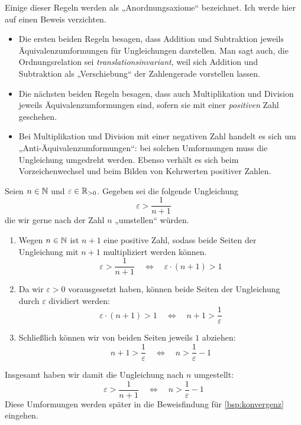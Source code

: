 \begin{bem} \label{ungleichungerklaerung}
    Einige dieser Regeln werden als „Anordnungsaxiome“ bezeichnet. Ich werde hier auf einen Beweis verzichten.%
    \begin{itemize}
        \item Die ersten beiden Regeln besagen, dass Addition und Subtraktion jeweils Äquivalenz\-umformungen für Ungleichungen darstellen. Man sagt auch, die Ordnungsrelation sei \emph{translationsinvariant}, weil sich Addition und Subtraktion als „Verschiebung“ der Zahlengerade vorstellen lassen.
        \item Die nächsten beiden Regeln besagen, dass auch Multiplikation und Division jeweils Äquivalenzumformungen sind, sofern sie mit einer \emph{positiven} Zahl geschehen.
        \item Bei Multiplikation und Division mit einer negativen Zahl handelt es sich um „Anti-Äquivalenzumformungen“: bei solchen Umformungen muss die Ungleichung umgedreht werden. Ebenso verhält es sich beim Vorzeichenwechsel und beim Bilden von Kehrwerten positiver Zahlen.
    \end{itemize}
\end{bem}


\begin{bsp} \label{bsp:ungleichungumstellen}
    Seien $n\in \mathbb N$ und $\varepsilon \in \mathbb R_{>0}$. Gegeben sei die folgende Ungleichung
        \[ \varepsilon > \frac{1}{n+1} \]
    die wir gerne nach der Zahl $n$ „umstellen“ würden.
    \begin{enumerate}
        \item Wegen $n\in \mathbb N$ ist $n+1$ eine positive Zahl, sodass beide Seiten der Ungleichung mit $n+1$ multipliziert werden können.
            \[ \varepsilon  > \frac{1}{n+1} \quad\iff\quad \varepsilon \cdot (n+1) > 1\]
        \item Da wir $\varepsilon>0$ vorausgesetzt haben, können beide Seiten der Ungleichung durch $\varepsilon$ dividiert werden:
            \[ \varepsilon \cdot (n+1) > 1 \quad\iff\quad n+1 > \frac{1}{\varepsilon} \]
        \item Schließlich können wir von beiden Seiten jeweils $1$ abziehen:
            \[ n+1 > \frac{1}{\varepsilon} \quad\iff\quad n > \frac{1}{\varepsilon}-1 \]
    \end{enumerate}
    Insgesamt haben wir damit die Ungleichung nach $n$ umgestellt:
        \[ \varepsilon > \frac{1}{n+1} \quad\iff\quad n > \frac{1}{\varepsilon}-1 \]
    Diese Umformungen werden später in die Beweisfindung für \cref{bsp:konvergenz} eingehen.
\end{bsp}


